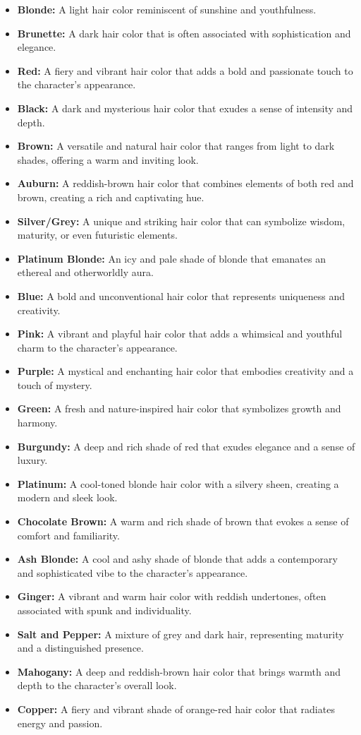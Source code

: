 \documentclass[12pt]{book}  %
\begin{document}
\begin{itemize}
    \item \textbf{Blonde:} A light hair color reminiscent of sunshine and youthfulness.
    \item \textbf{Brunette:} A dark hair color that is often associated with sophistication and elegance.
    \item \textbf{Red:} A fiery and vibrant hair color that adds a bold and passionate touch to the character's appearance.
    \item \textbf{Black:} A dark and mysterious hair color that exudes a sense of intensity and depth.
    \item \textbf{Brown:} A versatile and natural hair color that ranges from light to dark shades, offering a warm and inviting look.
    \item \textbf{Auburn:} A reddish-brown hair color that combines elements of both red and brown, creating a rich and captivating hue.
    \item \textbf{Silver/Grey:} A unique and striking hair color that can symbolize wisdom, maturity, or even futuristic elements.
    \item \textbf{Platinum Blonde:} An icy and pale shade of blonde that emanates an ethereal and otherworldly aura.
    \item \textbf{Blue:} A bold and unconventional hair color that represents uniqueness and creativity.
    \item \textbf{Pink:} A vibrant and playful hair color that adds a whimsical and youthful charm to the character's appearance.
    \item \textbf{Purple:} A mystical and enchanting hair color that embodies creativity and a touch of mystery.
    \item \textbf{Green:} A fresh and nature-inspired hair color that symbolizes growth and harmony.
    \item \textbf{Burgundy:} A deep and rich shade of red that exudes elegance and a sense of luxury.
    \item \textbf{Platinum:} A cool-toned blonde hair color with a silvery sheen, creating a modern and sleek look.
    \item \textbf{Chocolate Brown:} A warm and rich shade of brown that evokes a sense of comfort and familiarity.
    \item \textbf{Ash Blonde:} A cool and ashy shade of blonde that adds a contemporary and sophisticated vibe to the character's appearance.
    \item \textbf{Ginger:} A vibrant and warm hair color with reddish undertones, often associated with spunk and individuality.
    \item \textbf{Salt and Pepper:} A mixture of grey and dark hair, representing maturity and a distinguished presence.
    \item \textbf{Mahogany:} A deep and reddish-brown hair color that brings warmth and depth to the character's overall look.
    \item \textbf{Copper:} A fiery and vibrant shade of orange-red hair color that radiates energy and passion.
\end{itemize}
\end{document}
